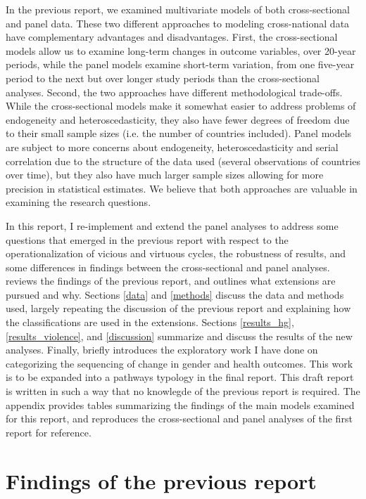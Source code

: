 \documentclass[12pt]{article}
\begin{document}
In the previous report, we examined multivariate models of both cross-sectional and panel data. These two different approaches to modeling cross-national data have complementary advantages and disadvantages.
First, the cross-sectional models allow us to examine long-term changes in outcome variables, over 20-year periods, while the panel models examine short-term variation, from one five-year period to the next but over longer study periods than the cross-sectional analyses.
Second, the two approaches have different methodological trade-offs. While the cross-sectional models make it somewhat easier to address problems of endogeneity and heteroscedasticity, they also have fewer degrees of freedom due to their small sample sizes (i.e. the number of countries included). Panel models are subject to more concerns about endogeneity, heteroscedasticity and serial correlation due to the structure of the data used (several observations of countries over time), but they also have much larger sample sizes allowing for more precision in statistical estimates. We believe that both approaches are valuable in examining the research questions.

In this report, I re-implement and extend the panel analyses to address some questions that emerged in the previous report with respect to the operationalization of vicious and virtuous cycles, the robustness of results, and some differences in findings between the cross-sectional and panel analyses.  reviews the findings of the previous report, and  outlines what extensions are pursued and why. Sections \ref{data} and \ref{methods} discuss the data and methods used, largely repeating the discussion of the previous report and explaining how the classifications are used in the extensions. Sections \ref{results_hg}, \ref{results_violence}, and \ref{discussion} summarize and discuss the results of the new analyses. Finally,  briefly introduces the exploratory work I have done on categorizing the sequencing of change in gender and health outcomes. This work is to be expanded into a pathways typology in the final report.
This draft report is written in such a way that no knowlegde of the previous report is required.
The appendix provides tables summarizing the findings of the main models examined for this report, and reproduces the cross-sectional and panel analyses of the first report for reference.

\section{Findings of the previous report}
\label{previous}
\end{document}
